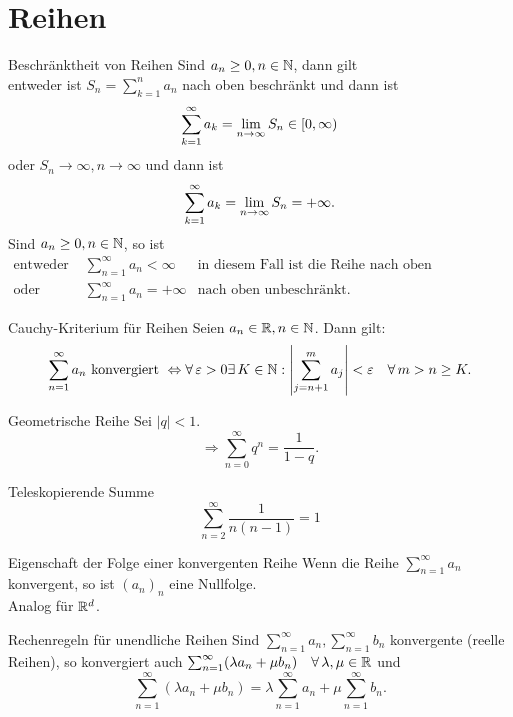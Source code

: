 \documentclass[main.tex]{subfiles}
\begin{document}
\section*{Reihen}
\begin{karte}{Beschränktheit von Reihen}
    Sind \(a_n \geq 0, n\in\mathbb{N} \), dann gilt\\
    entweder ist \(S_n = \sum_{k=1}^{n}a_n\) 
    nach oben beschränkt und dann ist 
    \[ \sum_{k=1}^{\infty}a_k = \lim\limits_{n\rightarrow\infty} 
    S_n \in [0,\infty) \]
    oder \(S_n \rightarrow \infty, 
    n\rightarrow\infty \) und dann 
    ist \[ \sum_{k=1}^{\infty}a_k 
    = \lim\limits_{n\rightarrow\infty}S_n = +\infty. \]
    Sind \(a_n \geq 0, n\in \mathbb{N} \), so ist
	\begin{align*}
        \text{entweder } 
        &\sum_{n=1}^{\infty}a_n < \infty 
        &\text{in diesem Fall ist die 
        Reihe nach oben beschränkt.}\\
        \text{oder } &\sum_{n=1}^{\infty}
        a_n = +\infty &\text{nach oben 
        unbeschränkt.}
	\end{align*}
\end{karte}
\begin{karte}{Cauchy-Kriterium für Reihen}
    Seien \(a_n \in\mathbb{R}, n\in\mathbb{N} \). Dann gilt: 
    \[ \sum_{n=1}^{\infty} a_n 
    \text{ konvergiert } \Leftrightarrow 
    \forall \varepsilon > 0 \exists 
    K \in \N : \abs{\sum_{j=n+1}^{m}a_j} 
    < \varepsilon \quad \forall m>n\geq K.\]
\end{karte}
\begin{karte}{Geometrische Reihe}
    Sei \(|q|<1\).
    \[ \Rightarrow \sum_{n=0}^{\infty} q^n 
    = \frac{1}{1-q}. \]
\end{karte}
\begin{karte}{Teleskopierende Summe}
    \[\sum_{n=2}^{\infty}\frac{1}{n(n-1)}=1 \]
\end{karte}
\begin{karte}{Eigenschaft der Folge einer konvergenten Reihe}
    Wenn die Reihe \(\sum_{n=1}^{\infty} 
    a_n\) konvergent, so ist \({(a_n)}_n\) 
    eine Nullfolge.\\
    Analog für \( \mathbb{R}^d \).
\end{karte}
\begin{karte}{Rechenregeln für unendliche Reihen}
    Sind \( \sum_{n=1}^{\infty}a_n, 
    \sum_{n=1}^{\infty}b_n \) konvergente 
    (reelle Reihen), so konvergiert auch 
    \( \sum_{n=1}^{\infty}(\lambda a_n 
    + \mu b_n) \quad \forall \lambda, 
    \mu \in\R \) und 
    \[ \sum_{n=1}^{\infty} 
    (\lambda a_n + \mu b_n) = \lambda 
    \sum_{n=1}^{\infty}a_n + \mu 
    \sum_{n=1}^{\infty}b_n. \]
\end{karte}
\end{document}
